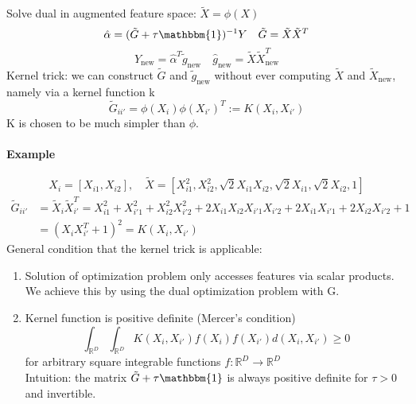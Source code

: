 \documentclass[11pt]{article}
\begin{document}
    Solve dual in augmented feature space: $\tilde{X}=\phi(X)$
    \begin{equation*}
      \hat{\alpha}=(\tilde{G}+\tau \mathbbm{1})^{-1}Y \quad \tilde{G}=\tilde{X}\tilde{X}^T
    \end{equation*}
    \begin{equation*}
      Y_{\text{new}}=\hat{\alpha}^T\tilde{g}_{\text{new}} \quad \hat{g}_{\text{new}}=\tilde{X}\tilde{X}_{\text{new}}^T
    \end{equation*}
    Kernel trick: we can construct $\tilde{G}$ and $\tilde{g}_{\text{new}}$ without ever computing
    $\tilde{X}$ and $\tilde{X}_{\text{new}}$, namely via a kernel function k
    \begin{equation*}
      \tilde{G}_{ii'}=\phi(X_i)\phi(X_{i'})^T :=K(X_i,X_{i'})
    \end{equation*}
    K is chosen to be much simpler than $\phi$.
    \noindent \paragraph{Example}
    \begin{equation*}
      X_i= [X_{i1}, X_{i2}], \quad \tilde{X}=[X_{i1}^2, X_{i2}^2, \sqrt{2}X_{i1}X_{i2},
      \sqrt{2}X_{i1}, \sqrt{2}X_{i2}, 1]
    \end{equation*}
    \begin{equation*}
      \begin{align*}
        \tilde{G}_{ii'}&=\tilde{X}_i\tilde{X}_{i'}^T=X_{i1}^2+X_{i'1}^2+
        X_{i2}^2X_{i'2}^2+2X_{i1}X_{i2}X_{i'1}X_{i'2}+2X_{i1}X_{i'1}
        +2X_{i2}X_{i'2}+1 \\
        &=(X_iX_{i'}^T+1)^2=K(X_i, X_{i'})
      \end{align*}
    \end{equation*}
    General condition that the kernel trick is applicable:
    \begin{enumerate}
      \item Solution of optimization problem only accesses features via scalar products.
      We achieve this by using the dual optimization problem with G.
      \item Kernel function is positive definite (Mercer's condition)
      \begin{equation*}
        \int_{\mathbb{R}^D}\int_{\mathbb{R}^D}K(X_i, X_{i'})f(X_i)f(X_{i'})d(X_i, X_{i'}) \geq 0
      \end{equation*}
      for arbitrary square integrable functions $f: \mathbb{R}^D \to \mathbb{R}^D$ \\
      Intuition: the matrix $\tilde{G}+\tau \mathbbm{1}$ is always positive definite for $\tau >0$ and invertible.
    \end{enumerate}
\end{document}
